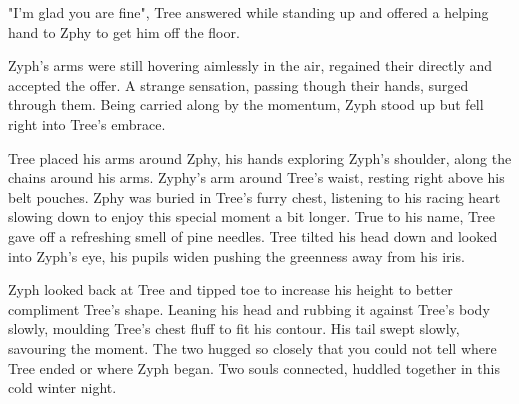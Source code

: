 "I'm glad you are fine", Tree answered while standing up and offered a helping hand to Zphy to get him off the floor.

Zyph's arms were still hovering aimlessly in the air, regained their directly and accepted the offer. A strange sensation, passing though their hands, surged through them. Being carried along by the momentum, Zyph stood up but fell right into Tree's embrace.

Tree placed his arms around Zphy, his hands exploring Zyph's shoulder, along the chains around his arms. Zyphy's arm around Tree's waist, resting right above his belt pouches. Zphy was buried in Tree's furry chest, listening to his racing heart slowing down to enjoy this special moment a bit longer. True to his name, Tree gave off a refreshing smell of pine needles. Tree tilted his head down and looked into Zyph's eye, his pupils widen pushing the greenness away from his iris.

Zyph looked back at Tree and tipped toe to increase his height to better compliment Tree's shape. Leaning his head and rubbing it against Tree's body slowly, moulding Tree's chest fluff to fit his contour. His tail swept slowly, savouring the moment. The two hugged so closely that you could not tell where Tree ended or where Zyph began. Two souls connected, huddled together in this cold winter night.